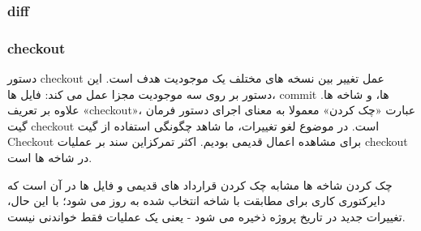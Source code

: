 \subsubsection{diff}
\subsubsection{checkout}
دستور checkout عمل تغییر بین نسخه های مختلف یک موجودیت هدف است. این دستور بر روی سه موجودیت مجزا عمل می کند: فایل ها، commit ها، و شاخه ها. علاوه بر تعریف «checkout»، عبارت «چک کردن» معمولا به معنای اجرای دستور فرمان گیت checkout است. در موضوع لغو تغییرات، ما شاهد چگونگی استفاده از گیت  Checkout برای مشاهده اعمال قدیمی بودیم. اکثر تمرکزاین سند بر عملیات checkout در شاخه ها است.

چک کردن شاخه ها مشابه چک کردن قرارداد های قدیمی و فایل ها در آن است که دایرکتوری کاری برای مطابقت با شاخه انتخاب شده به روز می شود؛ با این حال، تغییرات جدید در تاریخ پروژه ذخیره می شود - یعنی یک عملیات فقط خواندنی نیست.
